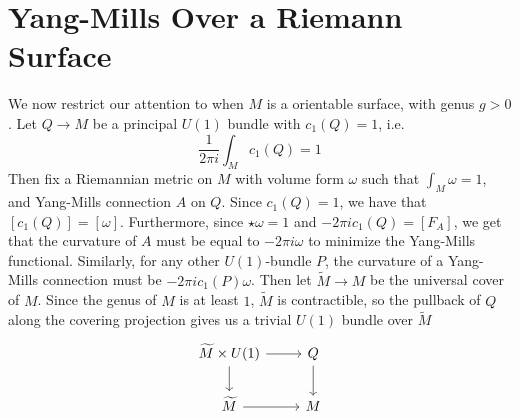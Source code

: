 \documentclass[psamsfonts, 12pt]{amsart}
\theoremstyle{definition}
\theoremstyle{remark}
\newcommand{\C}{\mathbb{C}}
\newcommand{\dbar}{\overline{\partial}}
\newcommand{\g}{\mathfrak{g}}
\newcommand{\defeq}{\vcentcolon=}
\DeclareMathOperator{\id}{id}
\begin{document}
\section{Yang-Mills Over a Riemann Surface}
%
\iffalse
The Hodge star operator maps $\Omega^1_M \to \Omega^1_M$, and satisfies
$\star^2 = -\id$, which induces an almost complex structure on $M$, giving us a
decomposition $\Omega^1_M(\C) = \Omega^{1,0}_M(\C) \oplus \Omega^{0,1}_M(\C)$
into the $\pm i$ eigenspaces of the complexified Hodge star. The operator
$\dbar \defeq \pi^{0,1} \circ d$ (where $\pi^{0,1}$ denotes projection onto
$\Omega^{0,1}_M(\C)$) satisfies $\dbar^2 = 0$ since by dimension reasons,
$\Omega^{0,2}_M(\C) = 0$, so the induced almost complex structure is integrable by the
Newlander-Nirenberg theorem. The same argument with projection onto $\Omega^{1,0}_M(\C)$
gives an operator $\partial$ satisfying $\partial^2 = 0$, and we get a decomposition
$d = \partial + \dbar$. Then given a principal bundle $P \to M$, We get a similar
decomposition for $\Omega^1_M(\g_P)$ after complexification giving a decomposition
$d_A = \partial_A + \dbar_A$ for any connection $A \in \mathscr{A}(P)$.
\fi
We now restrict our attention to when $M$ is a orientable surface, with genus $g > 0$.
Let $Q \to M$ be a principal $U(1)$ bundle with $c_1(Q) = 1$, i.e.
\[
\frac{1}{2\pi i} \int_M c_1(Q) = 1
\]
Then fix a Riemannian metric on $M$ with volume form $\omega$ such that
$\int_M \omega = 1$, and Yang-Mills connection $A$ on $Q$. Since $c_1(Q) = 1$, we have
that $[c_1(Q)] = [\omega]$. Furthermore, since $\star\omega = 1$ and
$-2\pi i c_1(Q) = [F_A]$, we get that the curvature of $A$ must be equal to
$-2\pi i \omega$ to minimize the Yang-Mills functional. Similarly, for any other
$U(1)$-bundle $P$, the curvature of a Yang-Mills connection must be
$-2\pi i c_1(P)\omega$. Then let $\widetilde{M} \to M$ be the universal cover of $M$.
Since the genus of $M$ is at least $1$, $\widetilde{M}$
is contractible, so the pullback of $Q$ along the covering projection gives us a
trivial $U(1)$ bundle over $\widetilde{M}$
\[\begin{tikzcd}
\widetilde{M} \times U(1)\ar[d] \ar[r] & Q \ar[d]\\
\widetilde{M} \ar[r] & M
\end{tikzcd}\]
\end{document}
